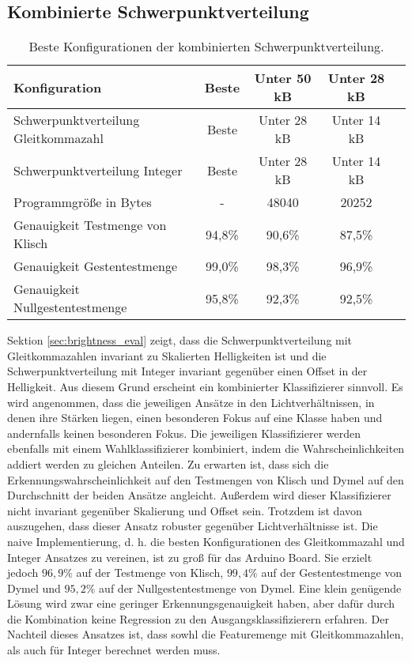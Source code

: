 \subsection{Kombinierte Schwerpunktverteilung}
\begin{table}[h!]
    \centering
    \begin{tabular}{ | l | c | c | c | c |}
        \hline
        Konfiguration & Beste & Unter 50 kB & Unter 28 kB \\\hline
        Schwerpunktverteilung Gleitkommazahl & Beste & Unter 28 kB & Unter 14 kB \\\hline
        Schwerpunktverteilung Integer & Beste &  Unter 28 kB & Unter 14 kB \\\hline
        Programmgröße in Bytes & - & 48040 & 20252 \\\hline
        Genauigkeit Testmenge von Klisch & 94,8\% & 90,6\% & 87,5\% \\\hline
        Genauigkeit Gestentestmenge & 99,0\% & 98,3\% & 96,9\% \\\hline
        Genauigkeit Nullgestentestmenge & 95,8\% & 92,3\% & 92,5\% \\\hline
    \end{tabular}
    \caption{Beste Konfigurationen der kombinierten Schwerpunktverteilung.}
    \label{tab:schwerpunktverteilung_int_and_float}
\end{table}
Sektion \ref{sec:brightness_eval} zeigt, dass die Schwerpunktverteilung mit Gleitkommazahlen invariant zu Skalierten Helligkeiten ist und die Schwerpunktverteilung mit Integer invariant
gegenüber einen Offset in der Helligkeit. Aus diesem Grund erscheint ein kombinierter Klassifizierer sinnvoll. Es wird angenommen, dass die jeweiligen Ansätze in den Lichtverhältnissen, in denen ihre
Stärken liegen, einen besonderen Fokus auf eine Klasse haben und andernfalls keinen besonderen Fokus.
\newline
\newline
Die jeweiligen Klassifizierer werden ebenfalls mit einem Wahlklassifizierer kombiniert, indem die Wahrscheinlichkeiten addiert werden zu gleichen Anteilen. Zu erwarten ist, dass sich die
Erkennungswahrscheinlichkeit auf den Testmengen von Klisch und Dymel auf den Durchschnitt der beiden Ansätze angleicht.
Außerdem wird dieser Klassifizierer nicht invariant gegenüber Skalierung und Offset sein. Trotzdem ist davon auszugehen, dass dieser Ansatz robuster gegenüber Lichtverhältnisse ist.
\newline
\newline
Die naive Implementierung, d. h. die besten Konfigurationen des Gleitkommazahl und Integer Ansatzes zu vereinen, ist zu groß für das Arduino Board. Sie erzielt jedoch $96,9\%$ auf der Testmenge
von Klisch, $99,4\%$ auf der Gestentestmenge von Dymel und $95,2\%$ auf der Nullgestentestmenge von Dymel. Eine klein genügende Lösung wird zwar eine geringer Erkennungsgenauigkeit haben, aber dafür
durch die Kombination keine Regression zu den Ausgangsklassifizierern erfahren.
\newline
\newline
Der Nachteil dieses Ansatzes ist, dass sowhl die Featuremenge mit Gleitkommazahlen, als auch für Integer berechnet werden muss.
